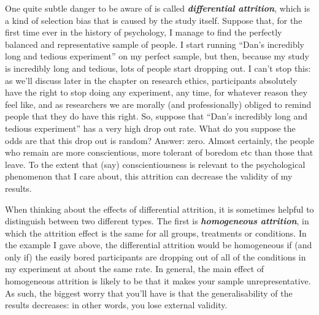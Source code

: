 \documentclass[]{book}
\begin{document}
One quite subtle danger to be aware of is called \textbf{\emph{differential attrition}}, which is a kind of selection bias that is caused by the study itself. Suppose that, for the first time ever in the history of psychology, I manage to find the perfectly balanced and representative sample of people. I start running ``Dan's incredibly long and tedious experiment'' on my perfect sample, but then, because my study is incredibly long and tedious, lots of people start dropping out. I can't stop this: as we'll discuss later in the chapter on research ethics, participants absolutely have the right to stop doing any experiment, any time, for whatever reason they feel like, and as researchers we are morally (and professionally) obliged to remind people that they do have this right. So, suppose that ``Dan's incredibly long and tedious experiment'' has a very high drop out rate. What do you suppose the odds are that this drop out is random? Answer: zero. Almost certainly, the people who remain are more conscientious, more tolerant of boredom etc than those that leave. To the extent that (say) conscientiousness is relevant to the psychological phenomenon that I care about, this attrition can decrease the validity of my results.

When thinking about the effects of differential attrition, it is sometimes helpful to distinguish between two different types. The first is \textbf{\emph{homogeneous attrition}}, in which the attrition effect is the same for all groups, treatments or conditions. In the example I gave above, the differential attrition would be homogeneous if (and only if) the easily bored participants are dropping out of all of the conditions in my experiment at about the same rate. In general, the main effect of homogeneous attrition is likely to be that it makes your sample unrepresentative. As such, the biggest worry that you'll have is that the generalisability of the results decreases: in other words, you lose external validity.
\end{document}
